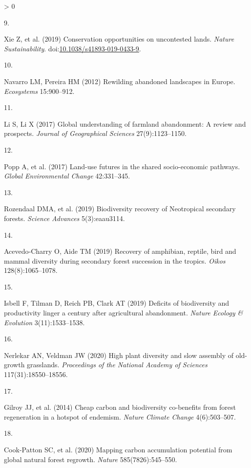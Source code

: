 \documentclass[9pt,twocolumn,twoside,lineno]{pnas-new}
\newlength{\csllabelwidth}
\newlength{\cslhangindent}
\newenvironment{CSLReferences}[2] %
 {%
  \setlength{\parindent}{0pt}
  \ifodd #1 \everypar{\setlength{\hangindent}{\cslhangindent}}\ignorespaces\fi
  \ifnum #2 > 0
  \setlength{\parskip}{#2\baselineskip}
  \fi
 }%
 {}
\newcommand{\CSLLeftMargin}[1]{\parbox[t]{\csllabelwidth}{#1}}
\newcommand{\CSLRightInline}[1]{\parbox[t]{\linewidth - \csllabelwidth}{#1}\break}
\begin{document}
\begin{CSLReferences}{0}{0}
\leavevmode\hypertarget{ref-Xie2019}{}%
\CSLLeftMargin{9. }
\CSLRightInline{Xie Z, et al. (2019) {Conservation opportunities on uncontested lands}. \emph{Nature Sustainability}. doi:\href{https://doi.org/10.1038/s41893-019-0433-9}{10.1038/s41893-019-0433-9}.}

\leavevmode\hypertarget{ref-Navarro2012}{}%
\CSLLeftMargin{10. }
\CSLRightInline{Navarro LM, Pereira HM (2012) {Rewilding abandoned landscapes in Europe}. \emph{Ecosystems} 15:900--912.}

\leavevmode\hypertarget{ref-Li2017}{}%
\CSLLeftMargin{11. }
\CSLRightInline{Li S, Li X (2017) {Global understanding of farmland abandonment: A review and prospects}. \emph{Journal of Geographical Sciences} 27(9):1123--1150.}

\leavevmode\hypertarget{ref-Popp2017}{}%
\CSLLeftMargin{12. }
\CSLRightInline{Popp A, et al. (2017) {Land-use futures in the shared socio-economic pathways}. \emph{Global Environmental Change} 42:331--345.}

\leavevmode\hypertarget{ref-Rozendaal2019}{}%
\CSLLeftMargin{13. }
\CSLRightInline{Rozendaal DMA, et al. (2019) {Biodiversity recovery of Neotropical secondary forests}. \emph{Science Advances} 5(3):eaau3114.}

\leavevmode\hypertarget{ref-Acevedo-Charry2019}{}%
\CSLLeftMargin{14. }
\CSLRightInline{Acevedo‐Charry O, Aide TM (2019) {Recovery of amphibian, reptile, bird and mammal diversity during secondary forest succession in the tropics}. \emph{Oikos} 128(8):1065--1078.}

\leavevmode\hypertarget{ref-Isbell2019}{}%
\CSLLeftMargin{15. }
\CSLRightInline{Isbell F, Tilman D, Reich PB, Clark AT (2019) {Deficits of biodiversity and productivity linger a century after agricultural abandonment}. \emph{Nature Ecology {\&} Evolution} 3(11):1533--1538.}

\leavevmode\hypertarget{ref-Nerlekar2020}{}%
\CSLLeftMargin{16. }
\CSLRightInline{Nerlekar AN, Veldman JW (2020) {High plant diversity and slow assembly of old-growth grasslands}. \emph{Proceedings of the National Academy of Sciences} 117(31):18550--18556.}

\leavevmode\hypertarget{ref-Gilroy2014}{}%
\CSLLeftMargin{17. }
\CSLRightInline{Gilroy JJ, et al. (2014) {Cheap carbon and biodiversity co-benefits from forest regeneration in a hotspot of endemism}. \emph{Nature Climate Change} 4(6):503--507.}

\leavevmode\hypertarget{ref-Cook-Patton2020}{}%
\CSLLeftMargin{18. }
\CSLRightInline{Cook-Patton SC, et al. (2020) {Mapping carbon accumulation potential from global natural forest regrowth}. \emph{Nature} 585(7826):545--550.}


\end{CSLReferences}
\end{document}
